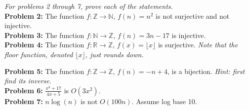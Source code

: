 \documentclass[12pt]{article}
\def\R{\mathbb R} %
\def\Z{\mathbb Z}
\def\N{\mathbb N}
\begin{document}
\textit{For problems 2 through 7, prove each of the statements.} \\ 

{\bf Problem 2:} The function $f:\Z \rightarrow \N$, $f(n)= n^2$ is not surjective and not injective.\\

{\bf Problem 3:} The function $f:\N \rightarrow \Z$, $f(n)= 3n-17$ is injective.\\

{\bf Problem 4:} The function $f:\R \rightarrow \Z$, $f(x)= \lfloor x \rfloor$ is surjective. \textit{Note that the floor function, denoted $\lfloor x \rfloor$, just rounds down. \\}

{\bf Problem 5:} The function $f:\Z \rightarrow \Z$, $f(n)=-n + 4$, is a bijection. \textit{Hint: first find its inverse.} \\

{\bf Problem 6:} $\frac{x^3+17}{4x+5}$ is $O(3x^2)$. \\

{\bf Problem 7:} $n \log(n)$ is not $O(100 n)$. Assume log base 10.\\
\end{document}
